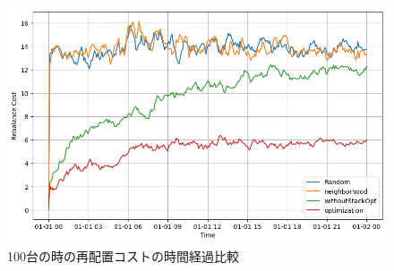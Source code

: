           \begin{figure}[b]
            \centering
            \includegraphics[scale=0.36]
            {figures/CompareRebalanceCost-100.png}
            \caption{100台の時の再配置コストの時間経過比較}
            \label{fig:100台の時の再配置コストの時間経過比較}
          \end{figure}
      
      
          
